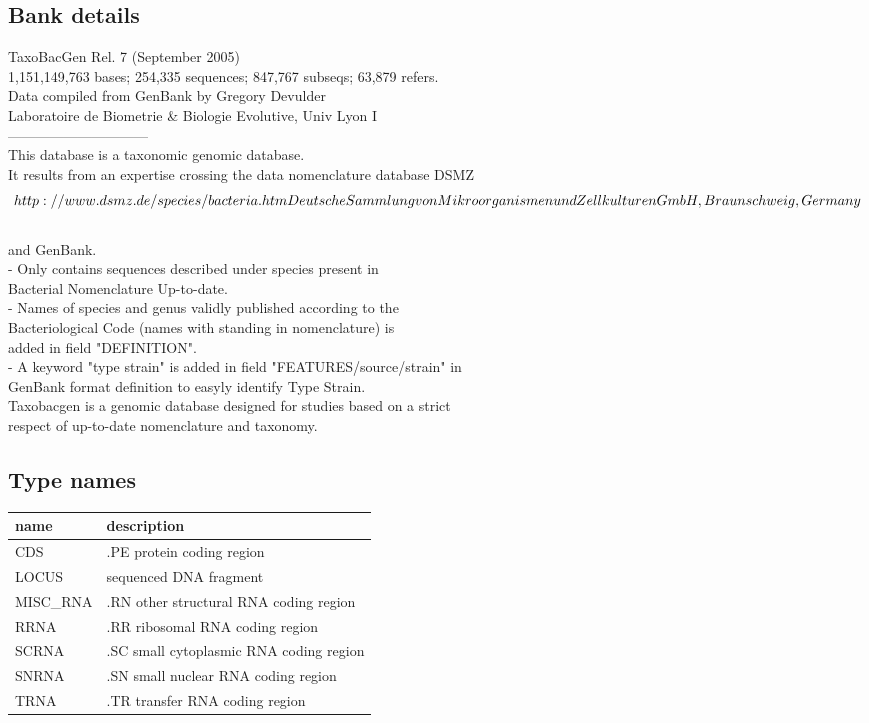 \documentclass{article}
\begin{document}
\begin{Schunk}
\subsection{Bank details}
TaxoBacGen Rel. 7 (September 2005)\\
1,151,149,763 bases; 254,335 sequences; 847,767 subseqs; 63,879 refers.\\
Data compiled from GenBank by Gregory Devulder\\
Laboratoire de Biometrie \& Biologie Evolutive, Univ Lyon I\\
------------------------------\\
This database is a taxonomic genomic database.\\
It results from an expertise crossing the data nomenclature database DSMZ\\
\[http://www.dsmz.de/species/bacteria.htm Deutsche Sammlung von\\
Mikroorganismen und Zellkulturen GmbH, Braunschweig, Germany\]\\
and GenBank.\\
- Only contains sequences described under species present in\\
Bacterial Nomenclature Up-to-date.\\
- Names of species and genus validly published according to the\\
Bacteriological Code (names with standing in nomenclature) is\\
added in field "DEFINITION".\\
- A keyword "type strain" is added in field "FEATURES/source/strain" in\\
GenBank format definition to easyly identify Type Strain.\\
Taxobacgen is a genomic database designed for studies based on a strict\\
respect of up-to-date nomenclature and taxonomy.

\subsection{Type names}
\noindent\begin{tabular}{ll}
\hline \hline
name & description\\
\hline
CDS & .PE protein coding region \\
LOCUS & sequenced DNA fragment \\
MISC\_RNA & .RN other structural RNA coding region \\
RRNA & .RR ribosomal RNA coding region \\
SCRNA & .SC small cytoplasmic RNA coding region \\
SNRNA & .SN small nuclear RNA coding region \\
TRNA & .TR transfer RNA coding region \\
\hline \hline
\end{tabular}


\end{Schunk}
\end{document}
